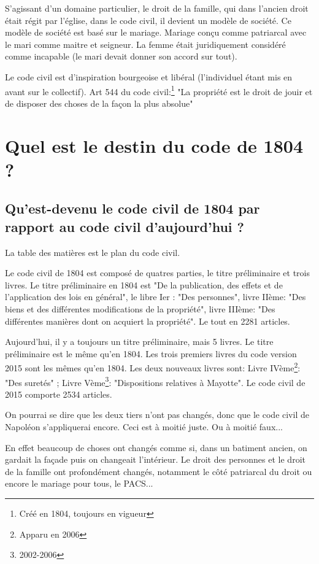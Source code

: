 \documentclass[12pt, a4paper, openany]{book}
\begin{document}
S'agissant d'un domaine particulier, le droit de la famille, qui dans l'ancien droit était régit par l'église, dans le code civil, il devient un modèle de société. Ce modèle de société est basé sur le mariage. Mariage conçu comme patriarcal avec le mari comme maitre et seigneur. La femme était juridiquement considéré comme incapable (le mari devait donner son accord sur tout).

Le code civil est d'inspiration bourgeoise et libéral (l'individuel étant mis en avant sur le collectif). Art 544 du code civil:\footnote{Créé en 1804, toujours en vigueur} "La propriété est le droit de jouir et de disposer des choses de la façon la plus absolue"

\section{Quel est le destin du code de 1804 ?}

\subsection{Qu'est-devenu le code civil de 1804 par rapport au code civil d'aujourd'hui ?}

La table des matières est le plan du code civil.

Le code civil de 1804 est composé de quatres parties, le titre préliminaire et trois livres. Le titre préliminaire en 1804 est "De la publication, des effets et de l'application des lois en général", le libre Ier : "Des personnes", livre IIème: "Des biens et des différentes modifications de la propriété", livre IIIème: "Des différentes manières dont on acquiert la propriété". Le tout en 2281 articles.

Aujourd'hui, il y a toujours un titre préliminaire, mais 5 livres. Le titre préliminaire est le même qu'en 1804. Les trois premiers livres du code version 2015 sont les mêmes qu'en 1804. Les deux nouveaux livres sont: Livre IVème\footnote{Apparu en 2006}: "Des suretés" ; Livre Vème\footnote{2002-2006}: "Dispositions relatives à Mayotte". Le code civil de 2015 comporte 2534 articles. 

On pourrai se dire que les deux tiers n'ont pas changés, donc que le code civil de Napoléon s'appliquerai encore. Ceci est à moitié juste. Ou à moitié faux...

En effet beaucoup de choses ont changés comme si, dans un batiment ancien, on gardait la façade puis on changeait l'intérieur. Le droit des personnes et le droit de la famille ont profondément changés, notamment le côté patriarcal du droit ou encore le mariage pour tous, le PACS...
\end{document}
